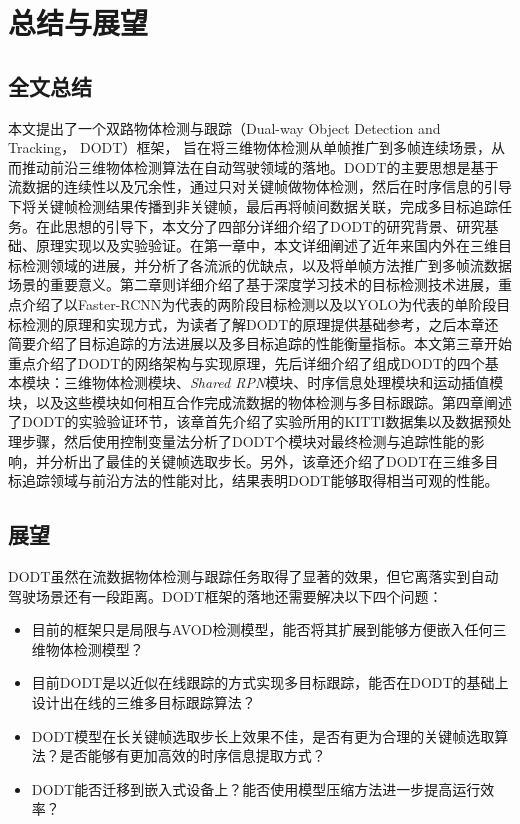 
\chapter{总结与展望}
\label{conclusion}

\section{全文总结}
\label{summary}
本文提出了一个双路物体检测与跟踪（Dual-way Object Detection and Tracking， DODT）框架， 旨在将三维物体检测从单帧推广到多帧连续场景，从而推动前沿三维物体检测算法在自动驾驶领域的落地。DODT的主要思想是基于流数据的连续性以及冗余性，通过只对关键帧做物体检测，然后在时序信息的引导下将关键帧检测结果传播到非关键帧，最后再将帧间数据关联，完成多目标追踪任务。在此思想的引导下，本文分了四部分详细介绍了DODT的研究背景、研究基础、原理实现以及实验验证。在第一章中，本文详细阐述了近年来国内外在三维目标检测领域的进展，并分析了各流派的优缺点，以及将单帧方法推广到多帧流数据场景的重要意义。第二章则详细介绍了基于深度学习技术的目标检测技术进展，重点介绍了以Faster-RCNN为代表的两阶段目标检测以及以YOLO为代表的单阶段目标检测的原理和实现方式，为读者了解DODT的原理提供基础参考，之后本章还简要介绍了目标追踪的方法进展以及多目标追踪的性能衡量指标。本文第三章开始重点介绍了DODT的网络架构与实现原理，先后详细介绍了组成DODT的四个基本模块：三维物体检测模块、\textit{Shared RPN}模块、时序信息处理模块和运动插值模块，以及这些模块如何相互合作完成流数据的物体检测与多目标跟踪。第四章阐述了DODT的实验验证环节，该章首先介绍了实验所用的KITTI数据集以及数据预处理步骤，然后使用控制变量法分析了DODT个模块对最终检测与追踪性能的影响，并分析出了最佳的关键帧选取步长。另外，该章还介绍了DODT在三维多目标追踪领域与前沿方法的性能对比，结果表明DODT能够取得相当可观的性能。


\section{展望}
\label{future}
DODT虽然在流数据物体检测与跟踪任务取得了显著的效果，但它离落实到自动驾驶场景还有一段距离。DODT框架的落地还需要解决以下四个问题：

\begin{itemize}
\item 目前的框架只是局限与AVOD检测模型，能否将其扩展到能够方便嵌入任何三维物体检测模型？
\item 目前DODT是以近似在线跟踪的方式实现多目标跟踪，能否在DODT的基础上设计出在线的三维多目标跟踪算法？
\item DODT模型在长关键帧选取步长上效果不佳，是否有更为合理的关键帧选取算法？是否能够有更加高效的时序信息提取方式？
\item DODT能否迁移到嵌入式设备上？能否使用模型压缩方法进一步提高运行效率？
\end{itemize}

